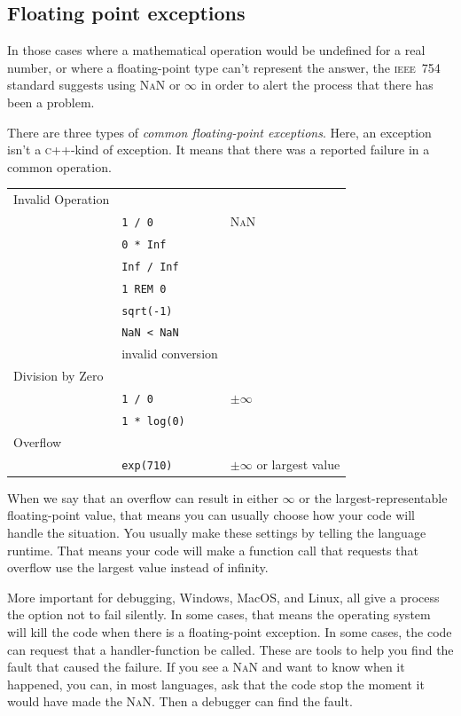 \documentclass[fleqn,10pt]{olplainarticle}
\newcommand{\cpp}{\textsc{c}++\xspace}
\newcommand{\nan}{\textsc{NaN}\xspace}
\newcommand{\ieee}{\textsc{ieee}\xspace}
\begin{document}
\subsection{Floating point exceptions}

In those cases where a mathematical operation would be undefined
for a real number, or where a floating-point type can't represent
the answer, the \ieee~754 standard suggests using \nan or $\infty$ in order
to alert the process that there has been a problem.

There are three types of \emph{common floating-point exceptions}.
Here, an exception isn't a \cpp{}-kind of exception. It means that
there was a reported failure in a common operation.

\begin{tabular}{lll}
Invalid Operation & & \\
 & \lstinline|1 / 0| & \nan \\
 & \lstinline|0 * Inf| & \\
 & \lstinline|Inf / Inf| & \\
 & \lstinline|1 REM 0| & \\
 & \lstinline|sqrt(-1)| & \\
 & \lstinline|NaN < NaN| & \\
 & invalid conversion & \\
Division by Zero & & \\
 & \lstinline|1 / 0| & $\pm\infty$ \\
 & \lstinline|1 * log(0)| & \\
Overflow & & \\
 & \lstinline|exp(710)| & $\pm\infty$ or largest value\\
\end{tabular}

When we say that an overflow can result in either $\infty$ or
the largest-representable floating-point value, that means you can
usually choose how your code will handle the situation. You usually
make these settings by telling the language runtime. That means your
code will make a function call that requests that overflow use the
largest value instead of infinity.

More important for debugging, Windows, MacOS, and Linux, all give
a process the option not to fail silently. In some cases, that means
the operating system will kill the code when there is a floating-point
exception. In some cases, the code can request that a handler-function
be called. These are tools to help you find the fault that caused the
failure. If you see a \nan and want to know when it happened, you can,
in most languages, ask that the code stop the moment it would have made
the \nan. Then a debugger can find the fault.
\end{document}
